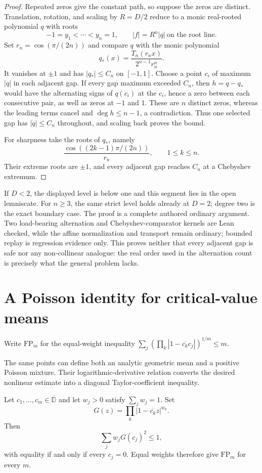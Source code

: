 \documentclass[11pt]{article}
\begin{document}
\begin{proof}
Repeated zeros give the constant path, so suppose the zeros are distinct.
Translation, rotation, and scaling by $R=D/2$ reduce to a monic real-rooted
polynomial $q$ with roots
\[
 -1=y_1<\cdots<y_n=1,
 \qquad |f|=R^n|q|\ \text{on the root line}.
\]
Set $r_n=\cos(\pi/(2n))$ and compare $q$ with the monic polynomial
\[
 q_*(x)=\frac{T_n(r_nx)}{2^{n-1}r_n^n}.
\]
It vanishes at $\pm1$ and has $|q_*|\le C_n$ on $[-1,1]$.  Choose a point
$c_i$ of maximum $|q|$ in each adjacent gap.  If every gap maximum exceeded
$C_n$, then $h=q-q_*$ would have the alternating signs of $q(c_i)$ at the
$c_i$, hence a zero between each consecutive pair, as well as zeros at
$-1$ and $1$.  These are $n$ distinct zeros, whereas the leading terms cancel
and $\deg h\le n-1$, a contradiction.  Thus one selected gap has
$|q|\le C_n$ throughout, and scaling back proves the bound.

For sharpness take the roots of $q_*$, namely
\[
 \frac{\cos((2k-1)\pi/(2n))}{r_n},\qquad 1\le k\le n.
\]
Their extreme roots are $\pm1$, and every adjacent gap reaches $C_n$ at a
Chebyshev extremum.
\end{proof}

If $D<2$, the displayed level is below one and this segment lies in the open
lemniscate.  For $n\ge3$, the same strict level holds already at $D=2$;
degree two is the exact boundary case.  The proof is a complete authored
ordinary argument.  Two load-bearing alternation and Chebyshev-comparator
kernels are Lean checked, while the affine normalization and transport remain
ordinary; bounded replay is regression evidence only.  This proves neither
that every adjacent gap is safe nor any non-collinear analogue: the real order
used in the alternation count is precisely what the general problem lacks.

\section{A Poisson identity for critical-value means}
\label{sec:freepoint}

Write $\mathrm{FP}_m$ for the equal-weight inequality
$\sum_j(\prod_k|1-\overline{c_k}c_j|)^{1/m}\le m$.

The same points can define both an analytic geometric mean and a positive
Poisson mixture.  Their logarithmic-derivative relation converts the desired
nonlinear estimate into a diagonal Taylor-coefficient inequality.

\begin{theorem}
\label{res:fp-weighted-all-degree}
Let $c_1,\ldots,c_m\in\overline{\mathbb D}$ and let $w_j>0$ satisfy
$\sum_j w_j=1$.  Set
\[
 G(z)=\prod_k |1-\overline{c_k}z|^{w_k}.
\]
Then
\[
 \sum_j w_j G(c_j)^2\le 1,
\]
with equality if and only if every $c_j=0$.  Equal weights therefore give
$\mathrm{FP}_m$ for every $m$.
\end{theorem}
\end{document}
